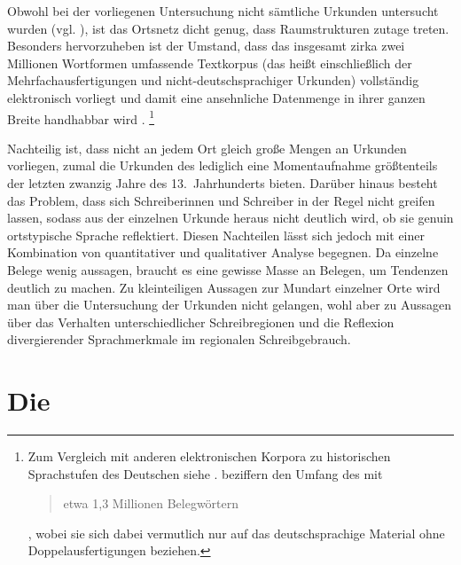 Obwohl bei der vorliegenen Untersuchung nicht sämtliche Urkunden
untersucht wurden (vgl. ), ist das Ortsnetz dicht genug,
dass Raumstrukturen zutage treten. Besonders hervorzuheben
ist der Umstand, dass das insgesamt zirka zwei Millionen Wortformen umfassende
Textkorpus (das heißt einschließlich der Mehrfachausfertigungen und
nicht-deutschsprachiger Urkunden) vollständig elektronisch vorliegt
\autocites{gniffkerapp2005}{cao-online} und damit eine ansehnliche Datenmenge
in ihrer ganzen Breite handhabbar wird
\autocite{beckerschallert2021,beckerschallert2022b}.%
%
	\footnote{Zum Vergleich mit anderen elektronischen Korpora zu
	historischen Sprachstufen des Deutschen siehe
	\citet{dipper2015}. \citet[391]{gniffkerapp2005} beziffern den Umfang des
	\CAO{} mit \blockquote{etwa 1,3 Millionen Belegwörtern}, wobei sie sich
	dabei vermutlich nur auf das deutschsprachige Material ohne
	Doppelausfertigungen beziehen.} %

Nachteilig ist, dass nicht an jedem Ort gleich große Mengen an
Urkunden vorliegen, zumal die Urkunden des \CAO{} lediglich eine
Momentaufnahme größtenteils der letzten zwanzig Jahre des 13.~Jahrhunderts
bieten. Darüber hinaus besteht das Problem, dass sich Schreiberinnen und
Schreiber in der Regel nicht greifen lassen, sodass
aus der einzelnen Urkunde heraus nicht deutlich wird, ob sie genuin
ortstypische Sprache reflektiert. Diesen Nachteilen lässt sich jedoch mit einer
Kombination von quantitativer und qualitativer Analyse begegnen. Da einzelne
Belege wenig aussagen, braucht es eine gewisse Masse an Belegen, um Tendenzen
deutlich zu machen. Zu kleinteiligen Aus\-sagen zur Mundart
einzelner Orte wird man über die Untersuchung der Urkunden nicht gelangen, wohl
aber zu Aussagen über das Verhalten unterschiedlicher Schreibregionen und die
Reflexion divergierender Sprachmerkmale im regionalen Schreibgebrauch.


\section{Die }
\label{sec:materialkc}


